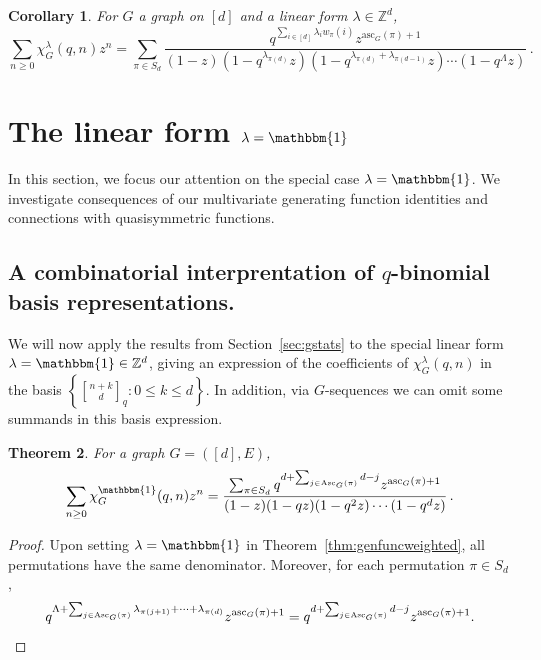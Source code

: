 \documentclass[11pt]{amsart}
\newtheorem{theorem}{Theorem}  [section] \numberwithin{equation}{section}
\newtheorem{corollary}[theorem]{Corollary}
\newcommand{\asc}{\mathrm{Asc}}
\newcommand{\ascnum}{\mathrm{asc}}
\newcommand{\qbinom}[2]{\genfrac[]{0pt}{}{#1}{#2}_q}
\begin{document}
\begin{corollary}
    For $G$ a graph on $[d]$ and a linear form $\lambda \in \mathbb{Z}^d$,
    \[
        \sum_{n \geq 0} \chi^\lambda_G(q,n) z^n = \sum_{\pi \in S_d} \frac{q^{\sum_{i \in [d]} \lambda_i
w_\pi(i)} z^{\ascnum_G(\pi)+1} }{(1-z)(1-q^{\lambda_{\pi(d)}}z) (1-q^{\lambda_{\pi(d)} + \lambda_{\pi(d-1)} } z)
\cdots (1-q^\Lambda z)}  \, .
    \]
\end{corollary}




\section{The linear form $\lambda=\mathbbm{1}$}\label{sec:linearform1}

In this section, we focus our attention on the special case $\lambda=\mathbbm{1}$.
We investigate consequences of our multivariate generating function identities and connections with quasisymmetric functions.

\subsection{A combinatorial interprentation of $q$-binomial basis representations.}
We will now apply the results from Section~\ref{sec:gstats} to the special linear form $\lambda = \mathbbm{1}
\in \mathbb{Z}^d$, giving an expression of the coefficients of $\chi_G^\lambda(q,n)$ in the basis $\left\{\qbinom{n+k}{d} : 0 \leq k \leq d\right\}$. 
In addition, via $G$-sequences we can omit some summands in this basis expression.

\begin{theorem}\label{thm:qchromaticallones}
    For a graph $G = ([d],E)$, 
    \[
        \sum_{n \geq 0} \chi^\mathbbm{1}_G(q,n) z^n =  \frac{\sum_{\pi \in S_d} q^{d + \sum_{j \in \asc_G(\pi)}
d-j} z^{\ascnum_G(\pi)+1} }{(1-z)(1-q z) (1-q^{2} z) \cdots (1-q^d z)} \, .
    \]
\end{theorem}

\begin{proof}
    Upon setting $\lambda=\mathbbm{1}$ in Theorem~\ref{thm:genfuncweighted}, all permutations have the same denominator. Moreover, for each permutation $\pi \in S_d$, 
    \[
        q^{\Lambda + \sum_{j \in \asc_G(\pi)} \lambda_{\pi(j+1)} + \cdots + \lambda_{\pi(d)}}
z^{\ascnum_G(\pi)+1}  = q^{d + \sum_{j \in \asc_G(\pi)} d-j } z^{\ascnum_G(\pi)+1}. \qedhere 
    \]
\end{proof}
\end{document}
